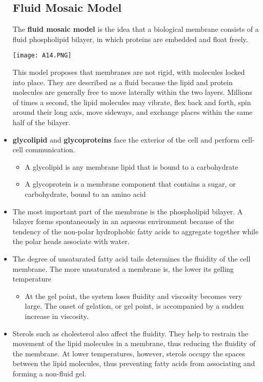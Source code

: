\documentclass[letterpaper]{article}
\begin{document}
\begin{itemize}
\subsection{Fluid Mosaic Model}
\begin{idea}
    The \textbf{fluid mosaic model} is the idea that a biological membrane consists of a fluid phospholipid bilayer, in which proteins are embedded and float freely.
    \begin{center}\texttt{[image: A14.PNG]}\end{center}
    This model proposes that membranes are not rigid, with molecules locked into place.  They are described as a fluid because the lipid and protein molecules are generally free to move laterally within the two layers. Millions of times a second, the lipid molecules may vibrate, flex back and forth, spin around their long axis, move sideways, and exchange places within the same half of the bilayer.
\end{idea}
\item \textbf{glycolipid} and \textbf{glycoproteins} face the exterior of the cell and perform cell-cell communication.
\begin{itemize}
    \item A glycolipid is any membrane lipid that is bound to a carbohydrate
    \item A glycoprotein is a membrane component that contains a sugar, or carbohydrate, bound to an amino acid
\end{itemize}
\item The most important part of the membrane is the phospholipid bilayer. A bilayer forms spontaneously in an aqueous environment because of the tendency of the non-polar hydrophobic fatty acids to aggregate together while the polar heads associate with water.
\item The degree of unsaturated fatty acid tails determines the fluidity of the cell membrane. The more unsaturated a membrane is, the lower its gelling temperature
\begin{itemize}
    \item At the gel point, the system loses fluidity and viscosity becomes very large. The onset of gelation, or gel point, is accompanied by a sudden increase in viscosity.
\end{itemize}
\item Sterols such as cholesterol also affect the fluidity. They help to restrain the movement of the lipid molecules in a membrane, thus reducing the fluidity of the membrane. At lower temperatures, however, sterols occupy the spaces between the lipid molecules, thus preventing fatty acids from associating and forming a non-fluid gel.

\end{itemize}
\end{document}
